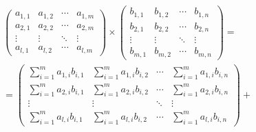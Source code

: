 \documentclass[12pt, a4paper]{article}
\begin{document}
\begin{align*} 
&\begin{pmatrix}
  a_{1,1} & a_{1,2} & \cdots & a_{1,m} \\
  a_{2,1} & a_{2,2} & \cdots & a_{2,m} \\
  \vdots  & \vdots  & \ddots & \vdots  \\
  a_{l,1} & a_{l,2} & \cdots & a_{l,m}
 \end{pmatrix} \times \begin{pmatrix}
  b_{1,1} & b_{1,2} & \cdots & b_{1,n} \\
  b_{2,1} & b_{2,2} & \cdots & b_{2,n} \\
  \vdots  & \vdots  & \ddots & \vdots  \\
  b_{m,1} & b_{m,2} & \cdots & b_{m,n}
 \end{pmatrix}=\\
  & =\begin{pmatrix}
  \sum\limits_{i=1}^m a_{1,i}b_{i,1} & \sum\limits_{i=1}^m a_{1,i}b_{i,2} & \cdots & \sum\limits_{i=1}^m a_{1,i}b_{i,n} \\
  \sum\limits_{i=1}^m a_{2,i}b_{i,1} & \sum\limits_{i=1}^m a_{2,i}b_{i,2} & \cdots & \sum\limits_{i=1}^m a_{2,i}b_{i,n} \\
  \vdots  & \vdots  & \ddots & \vdots  \\
  \sum\limits_{i=1}^m a_{l,i}b_{i,1} & \sum\limits_{i=1}^m a_{l,i}b_{i,2} & \cdots & \sum\limits_{i=1}^m a_{l,i}b_{i,n} \end{pmatrix}+
\end{align*}
\end{document}
